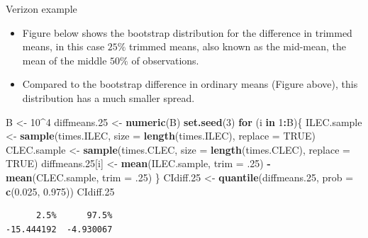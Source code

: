 \documentclass[
  ignorenonframetext,
]{beamer}
\newenvironment{Shaded}{\begin{snugshade}}{\end{snugshade}}
\newcommand{\AttributeTok}[1]{\textcolor[rgb]{0.13,0.29,0.53}{#1}}
\newcommand{\ConstantTok}[1]{\textcolor[rgb]{0.56,0.35,0.01}{#1}}
\newcommand{\ControlFlowTok}[1]{\textcolor[rgb]{0.13,0.29,0.53}{\textbf{#1}}}
\newcommand{\DecValTok}[1]{\textcolor[rgb]{0.00,0.00,0.81}{#1}}
\newcommand{\FloatTok}[1]{\textcolor[rgb]{0.00,0.00,0.81}{#1}}
\newcommand{\FunctionTok}[1]{\textcolor[rgb]{0.13,0.29,0.53}{\textbf{#1}}}
\newcommand{\NormalTok}[1]{#1}
\newcommand{\OtherTok}[1]{\textcolor[rgb]{0.56,0.35,0.01}{#1}}
\newcommand{\SpecialCharTok}[1]{\textcolor[rgb]{0.81,0.36,0.00}{\textbf{#1}}}
\begin{document}
\begin{frame}[fragile]{Verizon example}
\protect\hypertarget{verizon-example-9}{}
\begin{itemize}
\item
  Figure below shows the bootstrap distribution for the difference in
  trimmed means, in this case \(25\%\) trimmed means, also known as the
  mid-mean, the mean of the middle \(50\%\) of observations.
\item
  Compared to the bootstrap difference in ordinary means (Figure above),
  this distribution has a much smaller spread.
\end{itemize}

\tiny

\begin{Shaded}
\begin{Highlighting}[]
\NormalTok{B }\OtherTok{\textless{}{-}} \DecValTok{10}\SpecialCharTok{\^{}}\DecValTok{4}
\NormalTok{diffmeans}\FloatTok{.25} \OtherTok{\textless{}{-}} \FunctionTok{numeric}\NormalTok{(B)}
\FunctionTok{set.seed}\NormalTok{(}\DecValTok{3}\NormalTok{)}
\ControlFlowTok{for}\NormalTok{ (i }\ControlFlowTok{in} \DecValTok{1}\SpecialCharTok{:}\NormalTok{B)\{}
\NormalTok{  ILEC.sample }\OtherTok{\textless{}{-}} \FunctionTok{sample}\NormalTok{(times.ILEC, }\AttributeTok{size =} \FunctionTok{length}\NormalTok{(times.ILEC), }\AttributeTok{replace =} \ConstantTok{TRUE}\NormalTok{)}
\NormalTok{  CLEC.sample }\OtherTok{\textless{}{-}} \FunctionTok{sample}\NormalTok{(times.CLEC, }\AttributeTok{size =} \FunctionTok{length}\NormalTok{(times.CLEC), }\AttributeTok{replace =} \ConstantTok{TRUE}\NormalTok{)}
\NormalTok{  diffmeans}\FloatTok{.25}\NormalTok{[i] }\OtherTok{\textless{}{-}} \FunctionTok{mean}\NormalTok{(ILEC.sample, }\AttributeTok{trim =}\NormalTok{ .}\DecValTok{25}\NormalTok{) }\SpecialCharTok{{-}} \FunctionTok{mean}\NormalTok{(CLEC.sample, }\AttributeTok{trim =}\NormalTok{ .}\DecValTok{25}\NormalTok{)}
\NormalTok{\}}
\NormalTok{CIdiff}\FloatTok{.25} \OtherTok{\textless{}{-}} \FunctionTok{quantile}\NormalTok{(diffmeans}\FloatTok{.25}\NormalTok{, }\AttributeTok{prob =} \FunctionTok{c}\NormalTok{(}\FloatTok{0.025}\NormalTok{, }\FloatTok{0.975}\NormalTok{))}
\NormalTok{CIdiff}\FloatTok{.25}
\end{Highlighting}
\end{Shaded}

\begin{verbatim}
      2.5%      97.5% 
-15.444192  -4.930067 
\end{verbatim}

\normalsize
\end{frame}
\end{document}
